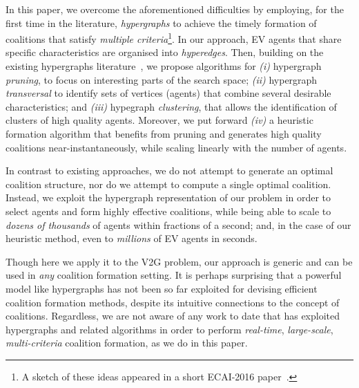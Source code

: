In this paper, we overcome the aforementioned difficulties by employing, for the first time in the literature, {\em hypergraphs} to achieve the timely formation of coalitions that satisfy {\em multiple criteria}\footnote{A sketch of these ideas appeared in a short ECAI-2016 paper~\cite{christianos2016}.}. In our approach, EV agents that share specific characteristics are organised into {\em hyperedges}. Then, building on the existing hypergraphs 
literature~\cite{eiter1995identifying,zhou2006learning}, we propose algorithms for {\em (i)} hypergraph {\em pruning},  to focus on interesting parts of the search space; 
{\em (ii)}  hypergraph {\em transversal} to identify sets of vertices (agents) that combine several desirable characteristics; and {\em (iii)} hypegraph {\em clustering}, that allows the identification of clusters of high quality agents. Moreover, we put forward {\em (iv)}  a heuristic formation algorithm that benefits from pruning and generates high quality coalitions near-instantaneously, while scaling linearly with the number of agents.

In contrast to existing approaches, we do not attempt to generate an optimal coalition structure, nor do we attempt to compute a single optimal coalition.
Instead, we exploit the hypergraph representation of our problem in order to select agents and form highly effective coalitions, while being able to scale to {\em dozens of thousands} of agents within fractions of a second; and, in the case of our heuristic method, even to {\em millions} of EV agents in seconds.

Though here we apply it to the V2G problem, our approach is generic and can be used in {\em any} coalition formation setting.
It is perhaps surprising that a powerful model like hypergraphs has not been so far exploited for devising efficient coalition formation methods, despite its intuitive connections to the concept of coalitions. Regardless, we are not aware of any work to date that has exploited hypergraphs and related algorithms in order to perform {\em real-time}, {\em large-scale}, {\em multi-criteria} coalition formation, as we do in this paper.

